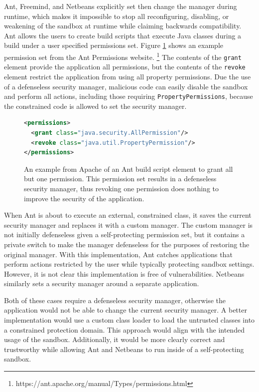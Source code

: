 \documentclass{sig-alternate}
\begin{document}
Ant, Freemind, and Netbeans explicitly set then change the manager
during runtime, which makes it impossible to stop all reconfiguring, disabling, or weakening of the sandbox at runtime while claiming backwards compatibility. Ant allows the users to create build scripts that
execute Java classes during a build under a user specified
permissions set. Figure \ref{fig:Ant Permissions Example}
shows an example permission set from the Ant Permissions website.%
\footnote{https://ant.apache.org/manual/Types/permissions.html%
} The contents of the \texttt{grant} element provide the application
all permissions, but the contents of the \texttt{revoke} element restrict
the application from using all property permissions. Due the use of a
defenseless security manager, malicious code can easily disable the sandbox and perform all actions,
including those requiring \texttt{PropertyPermissions}, because the constrained code is allowed to set the security manager.

\begin{figure}
\begin{lstlisting}[language=XML,basicstyle={\scriptsize}]
<permissions>   
  <grant class="java.security.AllPermission"/>   
  <revoke class="java.util.PropertyPermission"/> 
</permissions>
\end{lstlisting}

\caption{An example from Apache of an Ant build script element to grant all but one permission. This permission set results in a defenseless security manager, thus revoking one permission does nothing to improve the security of the application.}
\label{fig:Ant Permissions Example}
\end{figure}

When Ant is about to execute an external, constrained class, it saves the current security manager and replaces it with a custom manager. The custom manager is not initially defenseless given a self-protecting permission set, but it contains a private switch to make the manager defenseless for the purposes of restoring the original manager. With this implementation, Ant catches applications that perform actions
restricted by the user while typically protecting sandbox settings. However, it is not clear this implementation
is free of vulnerabilities. Netbeans similarly sets a security manager around a separate application.

Both of these cases require a defenseless security manager, otherwise
the application would not be able to change the current security manager.
A better implementation would use a custom class
loader to load the untrusted classes into a constrained protection
domain. This approach would align with the intended usage of the sandbox.
Additionally, it would be more clearly correct and trustworthy while
allowing Ant and Netbeans to run inside of a self-protecting sandbox.
\end{document}
